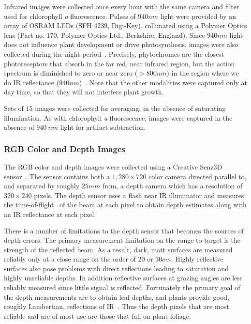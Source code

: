 Infrared images were collected once every hour with the same camera and filter used for chlorophyll {\it a} fluorescence.
Pulses of $940nm$ light were provided by an array of OSRAM LEDs (SFH $4239$, Digi-Key), collimated using a Polymer Optics lens (Part no. $170$, Polymer Optics Ltd., Berkshire, England).
Since $940nm$ light does not influence plant development or drive photosynthesis, images were also collected during the night period~\cite{eskins1992light}.
%
Precisely, phytochromes are the closest photoreceptors that absorb in the far red, near infrared region, but the action spectrum is diminished to zero or near zero ($>800nm$) in the region where we do IR reflectance ($940nm$)~\cite{butler1964actton}.
%
Note that the other modalities were captured only at day time, so that they will not interfere plant growth.


Sets of $15$ images were collected for averaging, in the absence of saturating illumination.
As with chlorophyll {\it a} fluorescence, images were captured in the absence of $940~nm$ light for artifact subtraction.



\subsubsection{RGB Color and Depth Images} %

The RGB color and depth images were collected using a Creative Senz3D sensor~\cite{nguyen2015vietnamese}. 
The sensor contains both a $1,280 \times 720$ color camera directed parallel to, and separated by roughly $25mm$ from, a depth camera which has a resolution of $320\times240$ pixels.
The depth sensor uses a flash near IR illuminator and measures the time-of-flight~\cite{Hansard2013} of the beam at each pixel to obtain depth estimates along with an IR reflectance at each pixel.

There is a number of limitations to the depth sensor that becomes the sources of depth errors.
The primary measurement limitation on the range-to-target is the strength of the reflected beam.
As a result, dark, matt surfaces are measured reliably only at a close range on the order of $20$ or $30cm$.
Highly reflective surfaces also pose problems with direct reflections leading to saturation and highly unreliable depths.
In addition reflective surfaces at grazing angles are less reliably measured since little signal is reflected.
Fortunately the primary goal of the depth measurements are to obtain leaf depths, and plants provide good, roughly Lambertian, reflections of IR~\cite{Chelle2006219}.  
Thus the depth pixels that are most reliable and are of most use are those that fall on plant foliage.

